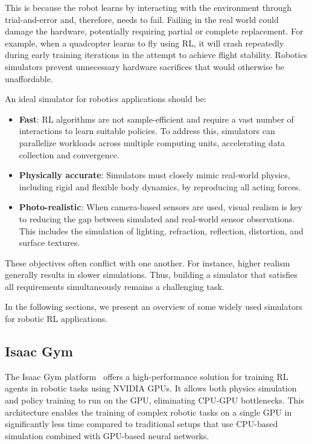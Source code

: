 \documentclass[a4paper,oneside]{book}
\theoremstyle{definition}
\begin{document}
This is because the robot learns by interacting with the environment through trial-and-error and, therefore, needs to fail. Failing in the real world could damage the hardware, potentially requiring partial or complete replacement. For example, when a quadcopter learns to fly using RL, it will crash repeatedly during early training iterations in the attempt to achieve flight stability. Robotics simulators prevent unnecessary hardware sacrifices that would otherwise be unaffordable.

An ideal simulator for robotics applications should be:

\begin{itemize}
    \item \textbf{Fast}: RL algorithms are not sample-efficient and require a vast number of interactions to learn suitable policies. To address this, simulators can parallelize workloads across multiple computing units, accelerating data collection and convergence.
    \item \textbf{Physically accurate}: Simulators must closely mimic real-world physics, including rigid and flexible body dynamics, by reproducing all acting forces.
    \item \textbf{Photo-realistic}: When camera-based sensors are used, visual realism is key to reducing the gap between simulated and real-world sensor observations. This includes the simulation of lighting, refraction, reflection, distortion, and surface textures.
\end{itemize}

These objectives often conflict with one another. For instance, higher realism generally results in slower simulations. Thus, building a simulator that satisfies all requirements simultaneously remains a challenging task.

In the following sections, we present an overview of some widely used simulators for robotic RL applications.

\subsection*{Isaac Gym}

The Isaac Gym platform~\cite{isaacgym} offers a high-performance solution for training RL agents in robotic tasks using NVIDIA GPUs. It allows both physics simulation and policy training to run on the GPU, eliminating CPU-GPU bottlenecks. This architecture enables the training of complex robotic tasks on a single GPU in significantly less time compared to traditional setups that use CPU-based simulation combined with GPU-based neural networks.
\end{document}

